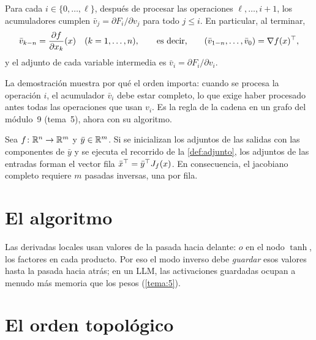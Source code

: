 \begin{teorema}\label{teo:inverso}
Para cada $i\in\{0,\dots,\ell\}$, después de procesar las operaciones $\ell,\dots,i+1$, los acumuladores cumplen $\bar v_j=\partial F_i/\partial v_j$ para todo $j\le i$. En particular, al terminar,
\[
\bar v_{k-n}=\frac{\partial f}{\partial x_k}(x)\quad(k=1,\dots,n),\qquad\text{es decir,}\qquad(\bar v_{1-n},\dots,\bar v_0)=\nabla f(x)^{\top} ,
\]
y el adjunto de cada variable intermedia es $\bar v_i=\partial F_i/\partial v_i$.
\end{teorema}

La demostración muestra por qué el orden importa: cuando se procesa la operación $i$, el acumulador $\bar v_i$ debe estar completo, lo que exige haber procesado antes todas las operaciones que usan $v_i$. Es la regla de la cadena en un grafo del módulo~9 (tema~5), ahora con su algoritmo.

\begin{proposicion}\label{prop:vjp}
Sea $f\colon\mathbb{R}^{n}\to\mathbb{R}^{m}$ y $\bar y\in\mathbb{R}^{m}$. Si se inicializan los adjuntos de las salidas con las componentes de $\bar y$ y se ejecuta el recorrido de la \cref{def:adjunto}, los adjuntos de las entradas forman el vector fila $\bar x^{\top}=\bar y^{\top} J_f(x)$. En consecuencia, el jacobiano completo requiere $m$ pasadas inversas, una por fila.
\end{proposicion}

\section{El algoritmo}

\addtocounter{figure}{1}%

\addtocounter{definicion}{1}%

\addtocounter{definicion}{1}%

\addtocounter{figure}{1}%

\addtocounter{definicion}{1}%

Las derivadas locales usan valores de la pasada hacia delante: $o$ en el nodo $\tanh$, los factores en cada producto. Por eso el modo inverso debe \emph{guardar} esos valores hasta la pasada hacia atrás; en un LLM, las activaciones guardadas ocupan a menudo más memoria que los pesos (\cref{tema:5}).

\section{El orden topológico}

